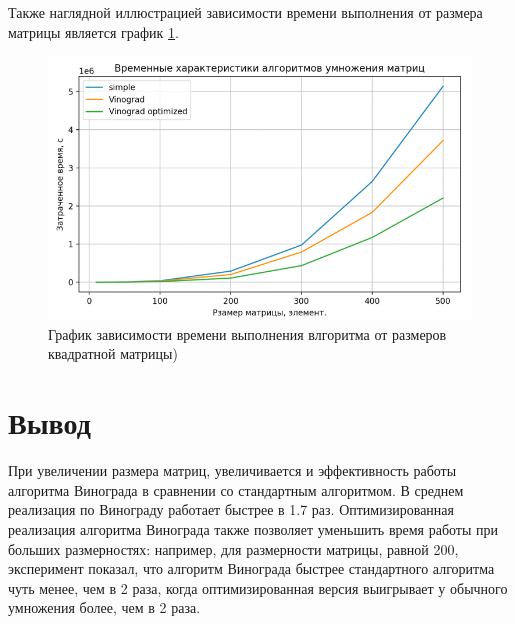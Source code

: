 Также наглядной иллюстрацией зависимости времени выполнения от размера матрицы является график \ref{gra:rand}.
\begin{figure}[h!]
	\centering
	\includegraphics[width=1\linewidth]{img/graph.png}
	\caption{График зависимости времени выполнения влгоритма от размеров квадратной матрицы)}
	\label{gra:rand}
\end{figure}
\newpage

\section*{Вывод}
При увеличении размера матриц, увеличивается и эффективность работы алгоритма Винограда в сравнении со стандартным алгоритмом. В среднем реализация по Винограду работает быстрее в 1.7 раз. Оптимизированная реализация алгоритма Винограда также позволяет уменьшить время работы при больших размерностях: например, для размерности матрицы, равной 200, эксперимент показал, что алгоритм Винограда быстрее стандартного алгоритма чуть менее, чем в 2 раза, когда оптимизированная версия выигрывает у обычного умножения более, чем в 2 раза. 
